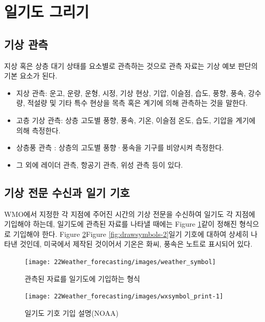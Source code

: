 \newpage
\section{일기도 그리기}

\subsection{기상 관측}
지상 혹은 상층 대기 상태를 요소별로 관측하는 것으로 관측 자료는 기상 예보 판단의 기본 요소가 된다.

\begin{itemize}
	\item 지상 관측: 운고, 운량, 운형, 시정, 기상 현상, 기압, 이슬점, 습도, 풍향, 풍속, 강수량, 적설량 및 기타 특수 현상을 목측 혹은 계기에 의해 관측하는 것을 말한다.
	\item 고층 기상 관측: 상층 고도별 풍향, 풍속, 기온, 이슬점 온도, 습도, 기압을 계기에 의해 측정한다.
	\item 상층풍 관측 : 상층의 고도별 풍향·풍속을 기구를 비양시켜 측정한다.
	\item 그 외에 레이더 관측, 항공기 관측, 위성 관측 등이 있다.
\end{itemize}


\subsection{기상 전문 수신과 일기 기호}

WMO에서 지정한 각 지점에 주어진 시간의 기상 전문을 수신하여 일기도 각 지점에 기입해야 하는데, 일기도에 관측된 자료를 나타낼 때에는 Figure \ref{fig:weathersymbol}\과 같이 정해진 형식으로 기입해야 한다. Figure \ref{fig:drawsymbols-1}\과 Figure \ref{fig:drawsymbols-2}\는 일기 기호에 대하여 상세히 나타낸 것인데, 미국에서 제작된 것이어서 기온은 화씨, 풍속은 노트로 표시되어 있다.

\begin{figure}[h]
	\centering
	\texttt{[image: 22Weather\_forecasting/images/weather\_symbol]}
	\caption{관측된 자료를 일기도에 기입하는 형식}
	\label{fig:weathersymbol}
\end{figure}

\begin{figure}[p]
	\centering
	\texttt{[image: 22Weather\_forecasting/images/wxsymbol\_print-1]}
	\caption{일기도 기호 기입 설명(NOAA)}
	\label{fig:drawsymbols-1}
\end{figure}

